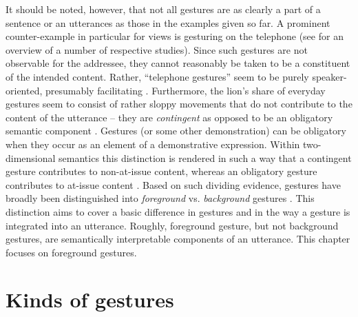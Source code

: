 \documentclass[output=paper]{langsci/langscibook}
\begin{document}
It should be noted, however, that not all gestures are as clearly a part of a sentence or an utterances as those in the examples given so far.
%
A prominent counter-example in particular for  views is gesturing on the telephone (see \citet{Bavelas:Gerwing:Sutton:Prevost:2008} for an overview of a number of respective studies).
%
Since such gestures are not observable for the addressee, they cannot reasonably be taken to be a constituent of the intended content. 
%
Rather, \enquote{telephone gestures} seem to be purely speaker-oriented, presumably facilitating .
%
Furthermore, the lion's share of everyday gestures seem to consist of rather sloppy movements that do not contribute to the content of the utterance -- they are \emph{contingent}  as opposed to be an obligatory  semantic component \citep{Luecking:2013:a}.
%
Gestures (or some other demonstration) can be obligatory when they occur as an element of a demonstrative expression.
%
Within two-dimensional semantics this distinction is rendered in such a way that a contingent gesture contributes to non-at-issue content, whereas an obligatory gesture contributes to at-issue content \citet{Ebert:2014:a,Schlenker:2018}.
%
Based on such dividing evidence, gestures have broadly been distinguished into \emph{foreground}  vs. \emph{background} gestures  \citep{Cooperrider:2017}. 
%
This distinction aims to cover a basic difference in gestures and in the way a gesture is integrated into an utterance. 
%
Roughly, foreground gesture, but not background gestures, are semantically interpretable components of an utterance.
%
This chapter focuses on foreground gestures.



\section{Kinds of gestures}
\label{sec:kinds-gestures}
\end{document}
